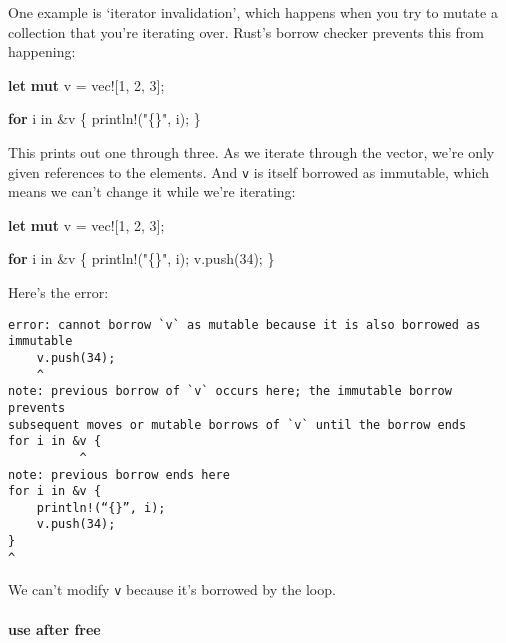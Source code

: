 \documentclass[a4paper,]{book}
\newenvironment{Shaded}{\begin{snugshade}}{\end{snugshade}}
\newcommand{\KeywordTok}[1]{\textcolor[rgb]{0.13,0.29,0.53}{\textbf{{#1}}}}
\newcommand{\DecValTok}[1]{\textcolor[rgb]{0.00,0.00,0.81}{{#1}}}
\newcommand{\StringTok}[1]{\textcolor[rgb]{0.31,0.60,0.02}{{#1}}}
\newcommand{\OtherTok}[1]{\textcolor[rgb]{0.56,0.35,0.01}{{#1}}}
\newcommand{\NormalTok}[1]{{#1}}
\let\oldparagraph\paragraph
\renewcommand{\paragraph}[1]{\oldparagraph{#1}\mbox{}}
\begin{document}
One example is `iterator invalidation', which happens when you try to
mutate a collection that you're iterating over. Rust's borrow checker
prevents this from happening:

\begin{Shaded}
\begin{Highlighting}[]
\KeywordTok{let} \KeywordTok{mut} \NormalTok{v = }\OtherTok{vec!}\NormalTok{[}\DecValTok{1}\NormalTok{, }\DecValTok{2}\NormalTok{, }\DecValTok{3}\NormalTok{];}

\KeywordTok{for} \NormalTok{i in &v \{}
    \OtherTok{println!}\NormalTok{(}\StringTok{"\{\}"}\NormalTok{, i);}
\NormalTok{\}}
\end{Highlighting}
\end{Shaded}

This prints out one through three. As we iterate through the vector,
we're only given references to the elements. And \texttt{v} is itself
borrowed as immutable, which means we can't change it while we're
iterating:

\begin{Shaded}
\begin{Highlighting}[]
\KeywordTok{let} \KeywordTok{mut} \NormalTok{v = }\OtherTok{vec!}\NormalTok{[}\DecValTok{1}\NormalTok{, }\DecValTok{2}\NormalTok{, }\DecValTok{3}\NormalTok{];}

\KeywordTok{for} \NormalTok{i in &v \{}
    \OtherTok{println!}\NormalTok{(}\StringTok{"\{\}"}\NormalTok{, i);}
    \NormalTok{v.push(}\DecValTok{34}\NormalTok{);}
\NormalTok{\}}
\end{Highlighting}
\end{Shaded}

Here's the error:

\begin{verbatim}
error: cannot borrow `v` as mutable because it is also borrowed as immutable
    v.push(34);
    ^
note: previous borrow of `v` occurs here; the immutable borrow prevents
subsequent moves or mutable borrows of `v` until the borrow ends
for i in &v {
          ^
note: previous borrow ends here
for i in &v {
    println!(“{}”, i);
    v.push(34);
}
^
\end{verbatim}

We can't modify \texttt{v} because it's borrowed by the loop.

\paragraph{use after free}\label{use-after-free}
\end{document}
